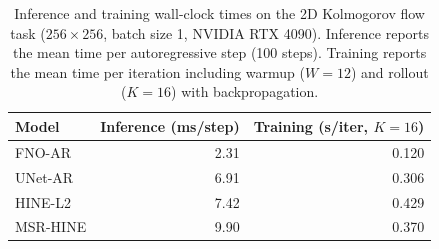 \begin{table}[t]
\centering
\caption{Inference and training wall-clock times on the 2D Kolmogorov flow task ($256\times256$, batch size 1, NVIDIA RTX 4090). Inference reports the mean time per autoregressive step (100 steps). Training reports the mean time per iteration including warmup ($W=12$) and rollout ($K=16$) with backpropagation.}
\label{tab:timing}
\begin{tabular}{lrr}
\toprule
Model & Inference (ms/step) & Training (s/iter, $K=16$) \\
\midrule
FNO-AR & 2.31 & 0.120 \\
UNet-AR & 6.91 & 0.306 \\
HINE-L2 & 7.42 & 0.429 \\
MSR-HINE & 9.90 & 0.370 \\
\bottomrule
\end{tabular}
\end{table}
